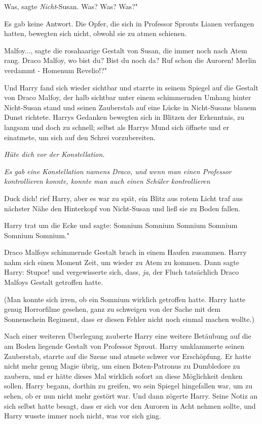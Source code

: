 \glqq Was\grqq{}, sagte \emph{Nicht}-Susan. \glqq Was? Was? Was?"

Es gab keine Antwort. Die Opfer, die sich in Professor Sprouts Lianen verfangen
hatten, bewegten sich nicht, obwohl sie zu atmen schienen.

\glqq Malfoy...\grqq{}, sagte die rosahaarige Gestalt von Susan, die immer noch
nach Atem rang. \glqq Draco Malfoy, wo bist du? Bist du noch da? Ruf schon die
Auroren! Merlin verdammt - Homenum Revelio!?"

Und Harry fand sich wieder sichtbar und starrte in seinem Spiegel auf die
Gestalt von Draco Malfoy, der halb sichtbar unter einem schimmernden Umhang
hinter Nicht-Susan stand und seinen Zauberstab auf eine Lücke in Nicht-Susans
blauem Dunst richtete. Harrys Gedanken bewegten sich in Blitzen der Erkenntnis,
zu langsam und doch zu schnell; selbst als Harrys Mund sich öffnete und er
einatmete, um sich auf den Schrei vorzubereiten.

\emph{Hüte dich vor der Konstellation.}

\emph{Es gab eine Konstellation namens Draco, und wenn man einen Professor kontrollieren konnte, konnte man auch einen Schüler kontrollieren}

\glqq Duck dich!\grqq{} rief Harry, aber es war zu spät, ein Blitz aus rotem
Licht traf aus nächster Nähe den Hinterkopf von Nicht-Susan und ließ sie zu
Boden fallen.

Harry trat um die Ecke und sagte: \glqq Somnium Somnium Somnium Somnium Somnium
Somnium."

Draco Malfoys schimmernde Gestalt brach in einem Haufen zusammen. Harry nahm
sich einen Moment Zeit, um wieder zu Atem zu kommen. Dann sagte Harry: \glqq
Stupor!\grqq{} und vergewisserte sich, dass, \emph{ja}, der Fluch tatsächlich
Draco Malfoys Gestalt getroffen hatte.

(Man konnte sich irren, ob ein Somnium wirklich getroffen hatte. Harry hatte
genug Horrorfilme gesehen, ganz zu schweigen von der Sache mit dem Sonnenschein
Regiment, dass er diesen Fehler nicht noch einmal machen wollte.)

Nach einer weiteren Überlegung zauberte Harry eine weitere Betäubung auf die am
Boden liegende Gestalt von Professor Sprout. Harry umklammerte seinen
Zauberstab, starrte auf die Szene und atmete schwer vor Erschöpfung. Er hatte
nicht mehr genug Magie übrig, um einen Boten-Patronus zu Dumbledore zu zaubern,
und er hätte dieses Mal wirklich sofort an diese Möglichkeit denken sollen.
Harry begann, dorthin zu greifen, wo sein Spiegel hingefallen war, um zu sehen,
ob er nun nicht mehr gestört war. Und dann zögerte Harry. Seine Notiz an sich
selbst hatte besagt, dass er sich vor den Auroren in Acht nehmen sollte, und
Harry wusste immer noch nicht, was vor sich ging.

